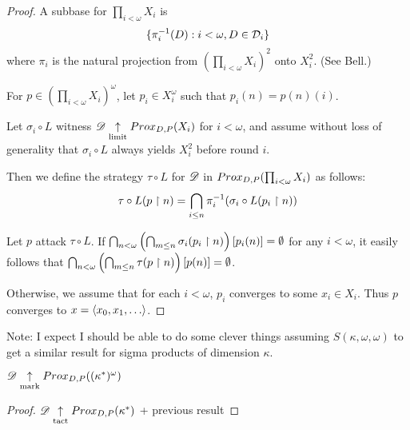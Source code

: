 \begin{proof}
  A subbase for $\prod_{i<\omega}X_i$ is
    \[
      \{\pi_i^{-1}(D):i<\omega, D\in\mathcal{D}_i\}
    \]
  where $\pi_i$ is the natural projection from 
  $\left(\prod_{i<\omega}X_i\right)^2$ onto $X_i^2$. (See Bell.)

  For $p\in \left(\prod_{i<\omega}X_i\right)^\omega$, let $p_i\in X_i^\omega$
  such that $p_i(n)=p(n)(i)$.

  Let $\sigma_i\circ L$ witness $\mathscr{D}\underset{\text{limit}}{\uparrow} Prox_{D,P}(X_i)$ for
  $i<\omega$, and assume without loss of generality that 
  $\sigma_i\circ L$ always yields $X_i^2$ before round $i$.

  Then we define the strategy $\tau\circ L$ for $\mathscr{D}$ in
  $Prox_{D,P}(\prod_{i<\omega}X_i)$ as follows:
    \[
      \tau\circ L(p\restriction n)
        =
      \bigcap_{i\leq n} \pi_i^{-1}(\sigma_i\circ L(p_i\restriction n))
    \]

  Let $p$ attack $\tau\circ L$. If
    $
      \bigcap_{n<\omega}
      \left(\bigcap_{m\leq n}\sigma_i(p_i\restriction n)\right)[p_i(n)]
      = \emptyset
    $
  for any $i<\omega$, it easily follows that 
    $
      \bigcap_{n<\omega}
      \left(\bigcap_{m\leq n}\tau(p\restriction n)\right)[p(n)]
      = \emptyset
    $.

  Otherwise, we assume that for each $i<\omega$, $p_i$ converges to some
  $x_i\in X_i$. Thus $p$ converges to $x=\<x_0,x_1,\dots\>$.
\end{proof}

Note: I expect I should be able to do some clever things 
assuming $S(\kappa,\omega,\omega)$ to get a similar result for sigma
products of dimension $\kappa$.

\begin{example}
  $\mathscr{D} \underset{\text{mark}}{\uparrow} Prox_{D,P}((\kappa^*)^\omega)$
\end{example}

\begin{proof}
  $\mathscr{D} \underset{\text{tact}}{\uparrow} Prox_{D,P}(\kappa^*)$ + previous result
\end{proof}






